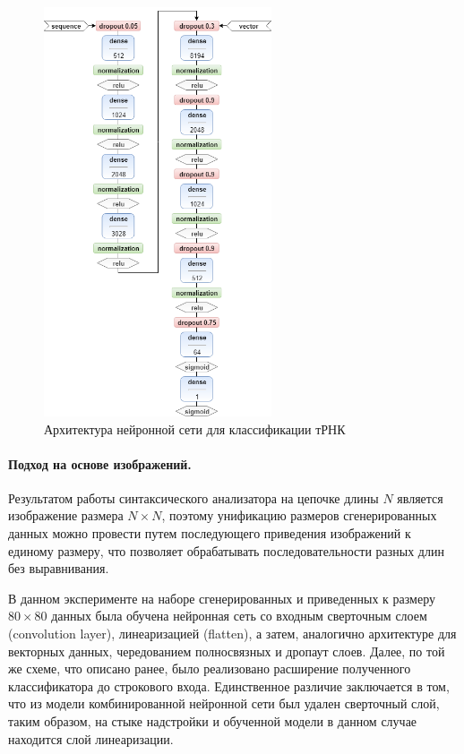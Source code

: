 \begin{figure} [!ht]
\begin{center}
\centering
\includegraphics[width=0.6\textwidth]{Lunina/pics/nn.png}
\caption{Архитектура нейронной сети для классификации тРНК}
\label{nn1}
\end{center}
\end{figure}

\paragraph{Подход на основе изображений.} Результатом работы синтаксического анализатора на цепочке длины $N$ является изображение размера $N\times N$, поэтому унификацию размеров сгенерированных данных можно провести путем последующего приведения изображений к единому размеру, что позволяет обрабатывать последовательности разных длин без выравнивания.

В данном эксперименте на наборе сгенерированных и приведенных к размеру $80\times80$ данных была обучена нейронная сеть со входным сверточным слоем (convolution layer), линеаризацией (flatten), а затем, аналогично архитектуре для векторных данных, чередованием полносвязных и дропаут слоев. Далее, по той же схеме, что описано ранее, было реализовано расширение полученного классификатора до строкового входа. Единственное различие заключается в том, что из модели комбинированной нейронной сети был удален сверточный слой, таким образом, на стыке надстройки и обученной модели в данном случае находится слой линеаризации.


